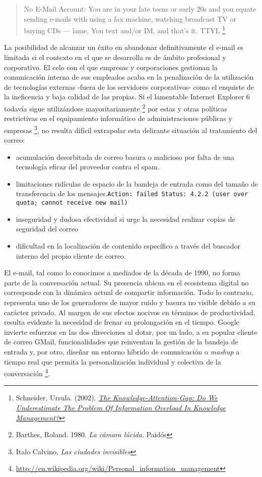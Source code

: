 \documentclass[12pt, a4paper,twoside]{book}
\begin{document}
\begin{quote}
No E-Mail Account: You are in your late teens or early 20s and you
equate sending e-mails with using a fax machine, watching broadcast
TV or buying CDs --- lame. You text and/or IM, and that's it. TTYL%
\footnote{Schneider, Ursula. (2002).
\emph{\href{http://www.jucs.org/jucs_8_5/the_knowledge_attention_gap/Schneider_U.html}{The Knowledge-Attention-Gap: Do We Underestimate The Problem Of Information Overload In Knowledge Management?}}}

\end{quote}
La posibilidad de alcanzar un éxito en abandonar definitivamente el
e-mail es limitada si el contexto en el que se desarrolla es de
ámbito profesional y corporativo. El celo con el que empresas y
corporaciones gestionan la comunicación interna de sus empleados
acaba en la penalización de la utilización de tecnologías externas
-fuera de los servidores corporativos- como el enquiste de la
ineficencia y baja calidad de las propias. Si el lamentable
Internet Explorer 6 todavía sigue utilizándose mayoritariamente%
\footnote{Barthes, Roland. 1980. \emph{La cámara lúcida}. Paidós}
por estas y otras políticas restrictivas en el equipamiento
informático de administraciones públicas y empresas%
\footnote{Italo Calvino, \emph{Las ciudades invisibles}},
no resulta difícil extrapolar esta delirante situación al
tratamiento del correo:

\begin{itemize}
\item
  acumulación desorbitada de correo basura o malicioso por falta de
  una tecnología eficaz del proveedor contra el spam.
\item
  limitaciones ridículas de espacio de la bandeja de entrada como del
  tamaño de transferencia de los
  mensajes.\verb!Action: failed Status: 4.2.2 (user over quota; cannot receive new mail)!
\item
  inseguridad y dudosa efectividad si urge la necesidad realizar
  copias de seguridad del correo
\item
  dificultad en la localización de contenido específico a través del
  buscador interno del propio cliente de correo.
\end{itemize}
El e-mail, tal como lo conocimos a mediados de la década de 1990,
no forma parte de la conversación actual. Su presencia ubicua en el
ecosistema digital no corresponde con la dinámica actual de
compartir información. Todo lo contrario, representa uno de los
generadores de mayor ruido y basura no visible debido a su carácter
privado. Al margen de sus efectos nocivos en términos de
productividad, resulta evidente la necesidad de frenar su
prolongación en el tiempo. Google invierte esfuerzos en las dos
direcciones al dotar, por un lado, a su popular cliente de correo
GMail, funcionalidades que reinventan la gestión de la bandeja de
entrada y, por otro, diseñar un entorno híbrido de comunicación o
\emph{mashup} a tiempo real que permita la personalización
individual y colectiva de la conversación%
\footnote{\href{http://en.wikipedia.org/wiki/Personal_information_management}{http://en.wikipedia.org/wiki/Personal\_information\_management}}.
\end{document}
